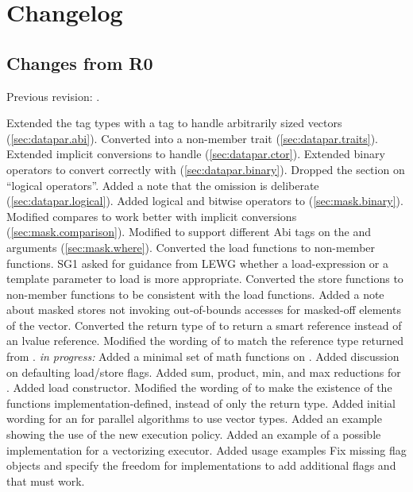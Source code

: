 \section{Changelog}
\subsection{Changes from R0}
Previous revision: \citep{P0214R0}.
\begin{itemize}
  \chck Extended the  tag types with a  tag to handle arbitrarily sized vectors (\ref{sec:datapar.abi}).
  \chck Converted  into a non-member trait (\ref{sec:datapar.traits}).
  \chck Extended implicit conversions to handle \fixedsizeN (\ref{sec:datapar.ctor}).
  \chck Extended binary operators to convert correctly with \fixedsizeN (\ref{sec:datapar.binary}).
  \chck Dropped the section on “\datapar logical operators”. Added a note that the omission is deliberate (\ref{sec:datapar.logical}).
  \chck Added logical and bitwise operators to \mask (\ref{sec:mask.binary}).
  \chck Modified \mask compares to work better with implicit conversions (\ref{sec:mask.comparison}).
  \chck Modified  to support different Abi tags on the \mask and \datapar arguments (\ref{sec:mask.where}).
  \chck Converted the load functions to non-member functions.
    SG1 asked for guidance from LEWG whether a load-expression or a template parameter to load is more appropriate.
  \chck Converted the store functions to non-member functions to be consistent with the load functions.
  \chck Added a note about masked stores not invoking out-of-bounds accesses for masked-off elements of the vector.
  \chck Converted the return type of \datapar{} to return a smart reference instead of an lvalue reference.
  \chck Modified the wording of \mask{} to match the reference type returned from \datapar{}.
  \todo \textit{in progress:} Added a minimal set of math functions on \datapar.
  \todo Added discussion on defaulting load/store flags.
  \todo Added sum, product, min, and max reductions for \datapar.
  \todo Added load constructor.
  \todo Modified the wording of  to make the existence of the functions implementation-defined, instead of only the return type.
  \todo Added initial wording for an  for parallel algorithms to use vector types.
  \todo Added an example showing the use of the new execution policy.
  \todo Added an example of a possible  implementation for a vectorizing executor.
  \todo Added usage examples
  \todo Fix missing flag objects and specify the freedom for implementations to add additional flags and that  must work.
\end{itemize}





